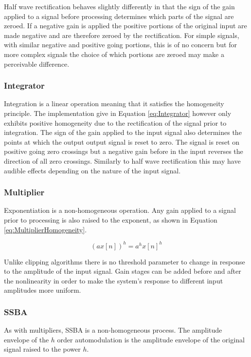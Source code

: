 			Half wave rectification behaves slightly differently in that the sign of the gain applied to a
			signal before processing determines which parts of the signal are zeroed. If a negative gain is
			applied the positive portions of the original input are made negative and are therefore zeroed by
			the rectification. For simple signals, with similar negative and positive going portions, this is
			of no concern but for more complex signals the choice of which portions are zeroed may make a
			perceivable difference.

		\subsubsection*{Integrator}
			Integration is a linear operation meaning that it satisfies the homogeneity principle. The
			implementation give in Equation \ref{eq:Integrator} however only exhibits positive homogeneity due
			to the rectification of the signal prior to integration. The sign of the gain applied to the input
			signal also determines the points at which the output output signal is reset to zero. The signal
			is reset on positive going zero crossings but a negative gain before in the input reverses the
			direction of all zero crossings. Similarly to half wave rectification this may have audible effects
			depending on the nature of the input signal.

		\subsubsection*{Multiplier}
			Exponentiation is a non-homogeneous operation. Any gain applied to a signal prior to processing is
			also raised to the exponent, as shown in Equation \ref{eq:MultiplierHomogeneity}.

			\begin{equation}
				(ax[n])^{h} = a^{h}x[n]^{h}
				\label{eq:MultiplierHomogeneity}
			\end{equation}

			Unlike clipping algorithms there is no threshold parameter to change in response to the amplitude
			of the input signal. Gain stages can be added before and after the nonlinearity in order to make
			the system's response to different input amplitudes more uniform.

		\subsubsection*{SSBA}
			As with multipliers, SSBA is a non-homogeneous process. The amplitude envelope of the $h$
			order automodulation is the amplitude envelope of the original signal raised to the power $h$. 

